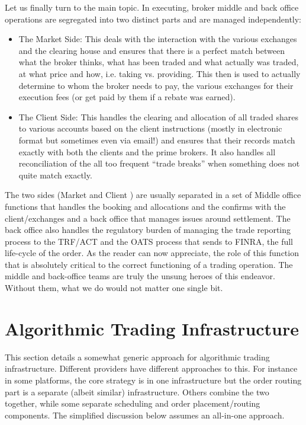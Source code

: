 Let us finally turn to the main topic. In executing, broker middle and back office operations are segregated into two distinct parts and are managed independently: 
        \begin{itemize}
        \item The Market Side: This deals with the interaction with the various exchanges  and the clearing house and ensures that there is a perfect match between what the broker thinks, what has been traded and what actually was traded, at what price and how, i.e. taking vs. providing. This then is used to actually determine to whom the broker needs to pay, the various exchanges for their execution fees (or get paid by them if a rebate was earned).
        \item The Client Side: This handles the clearing and allocation of all traded shares to various accounts based on the client instructions (mostly in electronic format but sometimes even via email!) and ensures that their records match exactly with both the clients and the prime brokers. It also handles all reconciliation of the all too frequent ``trade breaks'' when something does not quite match exactly.
        \end{itemize}


The two sides (Market and Client ) are usually separated in a set of Middle office functions that handles the booking and allocations and the confirms with the client/exchanges and a back office that manages issues around settlement. The back office also handles the regulatory burden of  managing the trade reporting process to the TRF/ACT and the OATS process that sends to FINRA, the full life-cycle of the order. As the reader can now appreciate, the role of this function that is absolutely critical to the correct functioning of a trading operation. The middle and back-office teams are truly the unsung heroes of this endeavor. Without them, what we do would not matter one single bit.



\section{Algorithmic Trading Infrastructure}

This section details a somewhat generic approach for algorithmic trading infrastructure. Different providers have different approaches to this. For instance in some platforms, the core strategy is in one infrastructure but the order routing part is a separate (albeit similar) infrastructure. Others combine the two together, while some separate scheduling and order placement/routing components. The simplified discussion below assumes an all-in-one approach.

